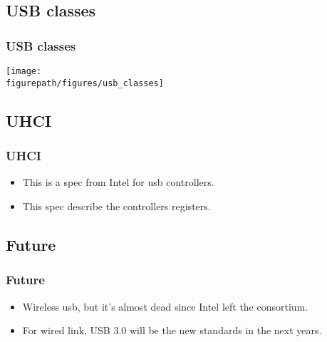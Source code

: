 \subsection{USB classes}
\begin{frame}
\frametitle{USB classes}
\begin{center}
\texttt{[image: \\figurepath/figures/usb\_classes]}
\end{center}
\end{frame}

\subsection{UHCI}
\begin{frame}
\frametitle{UHCI}
\begin{itemize}
\item This is a spec from Intel for usb controllers.
\item This spec describe the controllers registers.
\end{itemize}
\end{frame}

\subsection{Future}
\begin{frame}
\frametitle{Future}
\begin{itemize}
\item Wireless usb, but it's almost dead since Intel left the consortium.
\item For wired link, USB 3.0 will be the new standards in the next years.
\end{itemize}
\end{frame}





